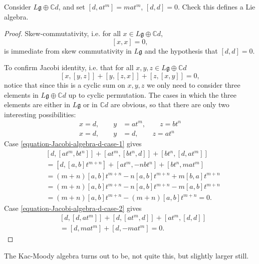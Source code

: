 \begin{exercise}
\label{exercise-Lie-algebra-d}
Consider $L\mathfrak{g}\oplus\mathbb{C}d$, and set 
$[d,at^m]=mat^m$, $[d,d]=0$. Check this defines a Lie algebra.
\end{exercise}

\begin{proof}
Skew-commutativity, i.e. for all $x \in L\mathfrak{g}\oplus\mathbb{C}d$,
\begin{equation}
\label{equation-skew-commutativity}
[x,x]=0,
\end{equation}
is immediate from 
skew commutativity in $L\mathfrak{g}$ and 
the hypothesis that $[d,d]=0$.

To confirm Jacobi identity, i.e. that for all 
$x,y,z \in L\mathfrak{g}\oplus\mathbb{C}d$
\begin{equation}
\label{equation-Jacobi-algebra-d-identity}
[x,[y,z]]+[y,[z,x]]+[z,[x,y]]=0,
\end{equation}
notice that since this is a cyclic sum on $x,y,z$ 
we only need to consider three elements in
$L\mathfrak{g} \oplus \mathbb{C}d$ up to cyclic permutation.
The cases in which the three elements are either in $L\mathfrak{g}$ or in
$\mathbb{C}d$ are obvious, so that there
are only two interesting possibilities:
\begin{align}
x=d,\qquad y&=at^m,\qquad z=bt^n
\label{equation-Jacobi-algebra-d-case-1}\\
x=d,\qquad y&=d,\qquad z=at^n
\label{equation-Jacobi-algebra-d-case-2}
\end{align}
Case \ref{equation-Jacobi-algebra-d-case-1} gives
\begin{align*}
& [d,[at^m,bt^n]]+[at^m,[bt^n,d]]+[bt^n,[d,at^m]]\\
&=[d,[a,b]t^{m+n}]+[at^m,-nbt^n]+[bt^n,mat^m]\\
&=(m+n)[a,b]t^{m+n}-n[a,b]t^{m+n}+m[b,a]t^{m+n}\\
&=(m+n)[a,b]t^{m+n}-n[a,b]t^{m+n}-m[a,b]t^{m+n}\\
&=(m+n)[a,b]t^{m+n}-(m+n)[a,b]t^{m+n}=0.
\end{align*}
Case \ref{equation-Jacobi-algebra-d-case-2} gives
\begin{align*}
&[d,[d,at^m]]+[d,[at^m,d]]+[at^m,[d,d]]\\
&=[d,mat^m]+[d,-mat^m]=0.
\end{align*}

\end{proof}

The Kac-Moody algebra turns out to be, not quite this, but slightly larger
still.


